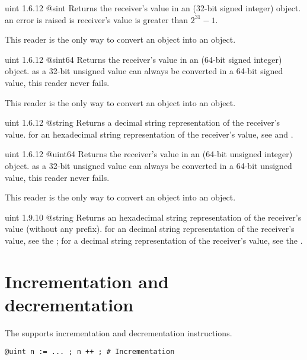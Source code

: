 {uint}
{1.6.12}
{@sint}
{Returns the receiver's value in an  (32-bit signed integer) object.}
{an error is raised is receiver's value is greater than $2^{31}-1$.}

This reader is the only way to convert an  object into an  object.




{uint}
{1.6.12}
{@sint64}
{Returns the receiver's value in an  (64-bit signed integer) object.}
{as a 32-bit unsigned value can always be converted in a 64-bit signed value, this reader never fails.}

This reader is the only way to convert an  object into an  object.


{uint}
{1.6.12}
{@string}
{Returns a decimal string representation of the receiver's value.}
{for an hexadecimal string representation of the receiver's value, see  and .}




{uint}
{1.6.12}
{@uint64}
{Returns the receiver's value in an  (64-bit unsigned integer) object.}
{as a 32-bit unsigned value can always be converted in a 64-bit unsigned value, this reader never fails.}

This reader is the only way to convert an  object into an  object.




{uint}
{1.9.10}
{@string}
{Returns an hexadecimal string representation of the receiver's value (without any prefix).}
{for an decimal string representation of the receiver's value, see the ; for a decimal string representation of the receiver's value, see the .}






\section{Incrementation and decrementation}

The  supports incrementation and decrementation instructions.

\texttt{@uint n := ... ; n ++ ; \# Incrementation}

